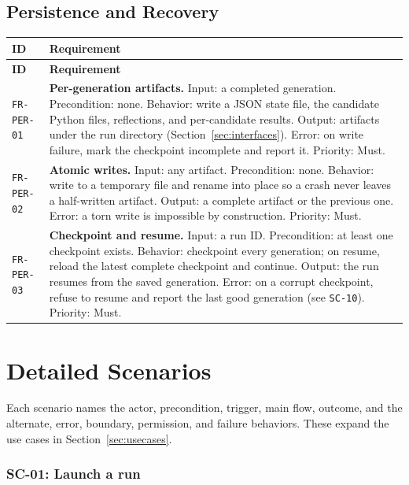 \documentclass[12pt,a4paper]{article}
\begin{document}
\subsection{Persistence and Recovery}

\begin{longtable}{@{}p{2.2cm}p{10.6cm}@{}}
\toprule
\textbf{ID} & \textbf{Requirement} \\
\midrule
\endfirsthead
\toprule
\textbf{ID} & \textbf{Requirement} \\
\midrule
\endhead
\bottomrule
\endfoot

\texttt{FR-PER-01} & \textbf{Per-generation artifacts.} Input: a completed generation. Precondition: none. Behavior: write a JSON state file, the candidate Python files, reflections, and per-candidate results. Output: artifacts under the run directory (Section~\ref{sec:interfaces}). Error: on write failure, mark the checkpoint incomplete and report it. Priority: Must. \\
\addlinespace[2pt]

\texttt{FR-PER-02} & \textbf{Atomic writes.} Input: any artifact. Precondition: none. Behavior: write to a temporary file and rename into place so a crash never leaves a half-written artifact. Output: a complete artifact or the previous one. Error: a torn write is impossible by construction. Priority: Must. \\
\addlinespace[2pt]

\texttt{FR-PER-03} & \textbf{Checkpoint and resume.} Input: a run ID. Precondition: at least one checkpoint exists. Behavior: checkpoint every generation; on resume, reload the latest complete checkpoint and continue. Output: the run resumes from the saved generation. Error: on a corrupt checkpoint, refuse to resume and report the last good generation (see \texttt{SC-10}). Priority: Must. \\
\bottomrule
\end{longtable}

\section{Detailed Scenarios}
\label{sec:scenarios}

Each scenario names the actor, precondition, trigger, main flow, outcome, and the alternate, error, boundary, permission, and failure behaviors. These expand the use cases in Section~\ref{sec:usecases}.

\subsubsection{SC-01: Launch a run}
\end{document}
